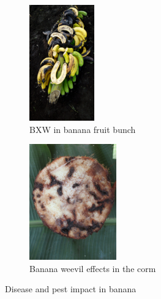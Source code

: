 \begin{figure}[h!]
 
\begin{subfigure}{0.5\textwidth}
\includegraphics[width=0.9\linewidth, height=5cm]{Figures/bunch.pdf} 
\caption{BXW in banana fruit bunch}
\label{fig:subim1}
\end{subfigure}
\begin{subfigure}{0.5\textwidth}
\includegraphics[width=0.9\linewidth, height=5cm]{Figures/corm.pdf}
\caption{Banana weevil effects in the corm}
\label{fig:subim2}
\end{subfigure}
 
\caption{Disease and pest impact in banana}
\label{fig:image2}
\end{figure}





